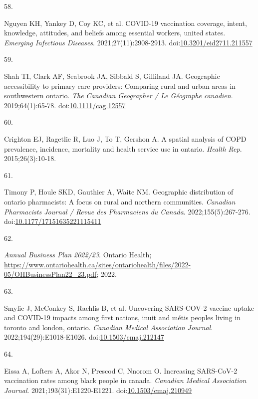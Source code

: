 \documentclass[
]{article}
\newlength{\cslhangindent}
\newlength{\csllabelwidth}
\newlength{\cslentryspacingunit} %
\newenvironment{CSLReferences}[2] %
 {%
  \setlength{\parindent}{0pt}
  \ifodd #1
  \let\oldpar\par
  \def\par{\hangindent=\cslhangindent\oldpar}
  \fi
  \setlength{\parskip}{#2\cslentryspacingunit}
 }%
 {}
\newcommand{\CSLLeftMargin}[1]{\parbox[t]{\csllabelwidth}{#1}}
\newcommand{\CSLRightInline}[1]{\parbox[t]{\linewidth - \csllabelwidth}{#1}\break}
\begin{document}
\begin{CSLReferences}{0}{0}
\leavevmode{}%
\CSLLeftMargin{58. }%
\CSLRightInline{Nguyen KH, Yankey D, Coy KC, et al. {COVID}-19
vaccination coverage, intent, knowledge, attitudes, and beliefs among
essential workers, united states. \emph{Emerging Infectious Diseases}.
2021;27(11):2908-2913.
doi:\href{https://doi.org/10.3201/eid2711.211557}{10.3201/eid2711.211557}}

\leavevmode{}%
\CSLLeftMargin{59. }%
\CSLRightInline{Shah TI, Clark AF, Seabrook JA, Sibbald S, Gilliland JA.
Geographic accessibility to primary care providers: Comparing rural and
urban areas in southwestern ontario. \emph{The Canadian Geographer / Le
G{é}ographe canadien}. 2019;64(1):65-78.
doi:\href{https://doi.org/10.1111/cag.12557}{10.1111/cag.12557}}

\leavevmode{}%
\CSLLeftMargin{60. }%
\CSLRightInline{Crighton EJ, Ragetlie R, Luo J, To T, Gershon A. A
spatial analysis of {COPD} prevalence, incidence, mortality and health
service use in ontario. \emph{Health Rep}. 2015;26(3):10-18.}

\leavevmode{}%
\CSLLeftMargin{61. }%
\CSLRightInline{Timony P, Houle SKD, Gauthier A, Waite NM. Geographic
distribution of ontario pharmacists: A focus on rural and northern
communities. \emph{Canadian Pharmacists Journal / Revue des Pharmaciens
du Canada}. 2022;155(5):267-276.
doi:\href{https://doi.org/10.1177/17151635221115411}{10.1177/17151635221115411}}

\leavevmode{}%
\CSLLeftMargin{62. }%
\CSLRightInline{\emph{{A}nnual {B}usiness {P}lan 2022/23}. Ontario
Health;
\url{https://www.ontariohealth.ca/sites/ontariohealth/files/2022-05/OHBusinessPlan22_23.pdf};
2022.}

\leavevmode{}%
\CSLLeftMargin{63. }%
\CSLRightInline{Smylie J, McConkey S, Rachlis B, et al. Uncovering
{SARS}-{COV}-2 vaccine uptake and {COVID}-19 impacts among first
nations, inuit and m{é}tis peoples living in toronto and london,
ontario. \emph{Canadian Medical Association Journal}.
2022;194(29):E1018-E1026.
doi:\href{https://doi.org/10.1503/cmaj.212147}{10.1503/cmaj.212147}}

\leavevmode{}%
\CSLLeftMargin{64. }%
\CSLRightInline{Eissa A, Lofters A, Akor N, Prescod C, Nnorom O.
Increasing {SARS}-{CoV}-2 vaccination rates among black people in
canada. \emph{Canadian Medical Association Journal}.
2021;193(31):E1220-E1221.
doi:\href{https://doi.org/10.1503/cmaj.210949}{10.1503/cmaj.210949}}


\end{CSLReferences}
\end{document}
